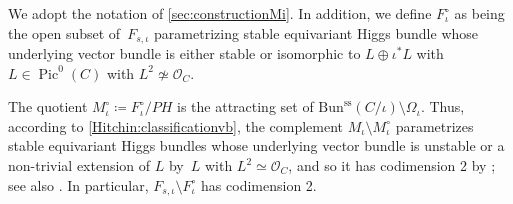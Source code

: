 \documentclass[11pt]{article}
\let\mathcal\mathscr
\newcommand{\PH}{\mathit{PH}}
\theoremstyle{definition}
\newcommand{\Pic}{\operatorname{Pic}}
\begin{document}
We adopt the notation of \cref{sec:constructionMi}. In addition, we define $F^{\circ}_{\iota}$ as being the open subset of~$F_{s, \iota}$ parametrizing stable equivariant Higgs bundle whose underlying vector bundle is either stable or isomorphic to $L \oplus \iota^*L$ with $L \in \Pic^0(C)$ with $L^2 \not\simeq \mathcal{O}_C$.

The quotient $M^{\circ}_{\iota} \coloneqq F^{\circ}_{\iota}/\PH$ is the attracting set of $\mathrm{Bun}^\mathrm{ss}(C/\iota) \setminus \Omega_{\iota}$. Thus, accord\-ing to \cref{Hitchin:classificationvb},
the complement $M_{\iota} \setminus M^\circ_{\iota}$ parametrizes stable equivariant Higgs bundles whose underlying vector bundle is unstable or a non-trivial extension of $L$ by~$L$ with $L^2 \simeq \mathcal{O}_C$, and so it has codimension 2 by \cite[Ex.\,3.13(iv)\,\&\,(v)]{Hitchin1987}; see also \cite[Lem.\,3.4]{KiemYoo08}. In particular, $F_{s, \iota} \setminus F^{\circ}_{\iota}$ has codimension 2.
\end{document}
